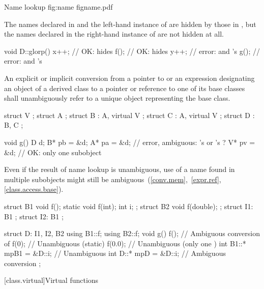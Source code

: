\begin{importgraphic}
{Name lookup}
{fig:name}
{figname.pdf}
\end{importgraphic}

\pnum
\enternote
The names declared in  and the left-hand instance of 
are hidden by those in , but the names declared in the
right-hand instance of  are not hidden at all.
\exitnote
\begin{codeblock}
void D::glorp() {
  x++;              // OK:  hides 
  f();              // OK:  hides 
  y++;              // error:  and 's 
  g();              // error:  and 's 
}
\end{codeblock}
\exitexample
{}%

\pnum
An explicit or implicit conversion from a pointer to or
an expression designating an object
of a
derived class to a pointer or reference to one of its base classes shall
unambiguously refer to a unique object representing the base class.
\enterexample
\begin{codeblock}
struct V { };
struct A { };
struct B : A, virtual V { };
struct C : A, virtual V { };
struct D : B, C { };

void g() {
  D d;
  B* pb = &d;
  A* pa = &d;       // error, ambiguous: 's  or 's ?
  V* pv = &d;       // OK: only one  subobject
}
\end{codeblock}
\exitexample

\pnum
\enternote
Even if the result of name lookup is unambiguous, use of a name found in
multiple subobjects might still be
ambiguous~(\ref{conv.mem},~\ref{expr.ref}, \ref{class.access.base}).\exitnote
\enterexample
\begin{codeblock}
struct B1 {
  void f();
  static void f(int);
  int i;
};
struct B2 {
  void f(double);
};
struct I1: B1 { };
struct I2: B1 { };

struct D: I1, I2, B2 {
  using B1::f;
  using B2::f;
  void g() {
    f();                        // Ambiguous conversion of 
    f(0);                       // Unambiguous (static)
    f(0.0);                     // Unambiguous (only one )
    int B1::* mpB1 = &D::i;     // Unambiguous
    int D::* mpD = &D::i;       // Ambiguous conversion
  }
};
\end{codeblock}\exitexample

[class.virtual]{Virtual functions}%
%
%

